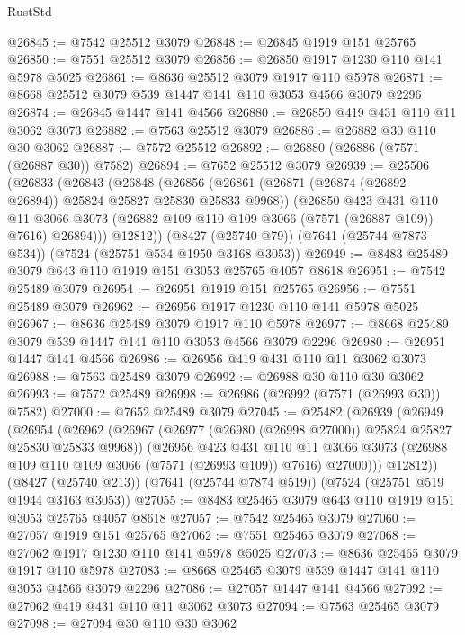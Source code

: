 \begin{lexlean}{RustStd}
\begin{coremodule}
{\begin{coremodule}
{{{{{{{{{{{{{{{{{{{{{{{{{{{{{{{{@26845 := @7542 @25512 @3079
@26848 := @26845 @1919 @151 @25765
@26850 := @7551 @25512 @3079
@26856 := @26850 @1917 @1230 @110 @141 @5978 @5025
@26861 := @8636 @25512 @3079 @1917 @110 @5978
@26871 := @8668 @25512 @3079 @539 @1447 @141 @110 @3053 @4566 @3079 @2296
@26874 := @26845 @1447 @141 @4566
@26880 := @26850 @419 @431 @110 @11 @3062 @3073
@26882 := @7563 @25512 @3079
@26886 := @26882 @30 @110 @30 @3062
@26887 := @7572 @25512
@26892 := @26880 (@26886 (@7571 (@26887 @30)) @7582)
@26894 := @7652 @25512 @3079
@26939 := @25506
    (@26833
      (@26843
        (@26848
          (@26856
            (@26861 (@26871 (@26874 (@26892 @26894)) @25824 @25827 @25830 @25833 @9968))
            (@26850
              @423
              @431
              @110
              @11
              @3066
              @3073
              (@26882 @109 @110 @109 @3066 (@7571 (@26887 @109)) @7616)
              @26894)))
        @12812))
    (@8427 (@25740 @79))
    (@7641 (@25744 @7873 @534))
    (@7524 (@25751 @534 @1950 @3168 @3053))
@26949 := @8483 @25489 @3079 @643 @110 @1919 @151 @3053 @25765 @4057 @8618
@26951 := @7542 @25489 @3079
@26954 := @26951 @1919 @151 @25765
@26956 := @7551 @25489 @3079
@26962 := @26956 @1917 @1230 @110 @141 @5978 @5025
@26967 := @8636 @25489 @3079 @1917 @110 @5978
@26977 := @8668 @25489 @3079 @539 @1447 @141 @110 @3053 @4566 @3079 @2296
@26980 := @26951 @1447 @141 @4566
@26986 := @26956 @419 @431 @110 @11 @3062 @3073
@26988 := @7563 @25489 @3079
@26992 := @26988 @30 @110 @30 @3062
@26993 := @7572 @25489
@26998 := @26986 (@26992 (@7571 (@26993 @30)) @7582)
@27000 := @7652 @25489 @3079
@27045 := @25482
    (@26939
      (@26949
        (@26954
          (@26962
            (@26967 (@26977 (@26980 (@26998 @27000)) @25824 @25827 @25830 @25833 @9968))
            (@26956
              @423
              @431
              @110
              @11
              @3066
              @3073
              (@26988 @109 @110 @109 @3066 (@7571 (@26993 @109)) @7616)
              @27000)))
        @12812))
    (@8427 (@25740 @213))
    (@7641 (@25744 @7874 @519))
    (@7524 (@25751 @519 @1944 @3163 @3053))
@27055 := @8483 @25465 @3079 @643 @110 @1919 @151 @3053 @25765 @4057 @8618
@27057 := @7542 @25465 @3079
@27060 := @27057 @1919 @151 @25765
@27062 := @7551 @25465 @3079
@27068 := @27062 @1917 @1230 @110 @141 @5978 @5025
@27073 := @8636 @25465 @3079 @1917 @110 @5978
@27083 := @8668 @25465 @3079 @539 @1447 @141 @110 @3053 @4566 @3079 @2296
@27086 := @27057 @1447 @141 @4566
@27092 := @27062 @419 @431 @110 @11 @3062 @3073
@27094 := @7563 @25465 @3079
@27098 := @27094 @30 @110 @30 @3062
}}}}}}}}}}}}}}}}}}}}}}}}}}}}}}}}
\end{coremodule}}
\end{coremodule}
\end{lexlean}
